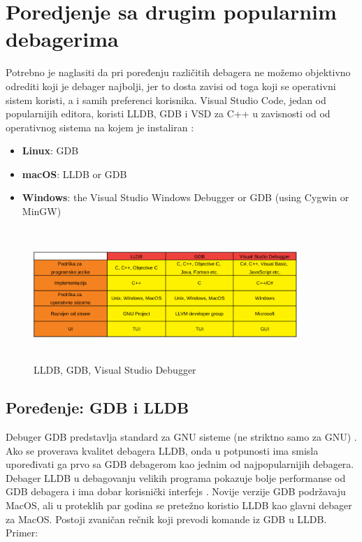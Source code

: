 \documentclass[a4paper]{article}
\begin{document}
\section{Poredjenje sa drugim popularnim debagerima}
\label{sec:naslovN}

Potrebno je naglasiti da pri poređenju različitih debagera ne možemo objektivno odrediti koji je debager najbolji, jer to dosta zavisi od toga koji se operativni sistem koristi, a i samih preferenci korisnika. Visual Studio Code, jedan od popularnijih editora, koristi LLDB, GDB i VSD za C++ u zavisnosti od od operativnog sistema na kojem je instaliran \cite{vsc_support}:
\begin{itemize}
	\item \textbf{Linux}: GDB
	\item \textbf{macOS}: LLDB or GDB
	\item \textbf{Windows}: the Visual Studio Windows Debugger or GDB (using Cygwin or MinGW)
\end{itemize}

\begin{figure}[h!]
	\begin{center}
		\includegraphics[width=100mm,height=50mm]{Slike/tabela_poredjenje1.png}
	\end{center}
	\caption{LLDB, GDB, Visual Studio Debugger \cite{gdb}\cite{lldb}\cite{vsd}}
	\label{fig:tabela_poredjenje1}
\end{figure}

\subsection{Poređenje: GDB i LLDB}
\label{subsec: GDB i LLDB}

Debuger GDB predstavlja standard za GNU sisteme (ne striktno samo za GNU) \cite{gdb}. Ako se proverava kvalitet debagera LLDB, onda u potpunosti ima smisla upoređivati ga prvo sa GDB debagerom kao jednim od najpopularnijih debagera. Debager LLDB u debagovanju velikih programa pokazuje bolje performanse od GDB debagera i ima dobar korisnički interfejs \cite{lldb_project_blog}. Novije verzije GDB podržavaju MacOS, ali u proteklih par godina se pretežno koristio LLDB kao glavni debager za MacOS. Postoji zvaničan rečnik koji prevodi komande iz GDB u LLDB. \cite {lldb_to_gdb_map} Primer:
\end{document}
